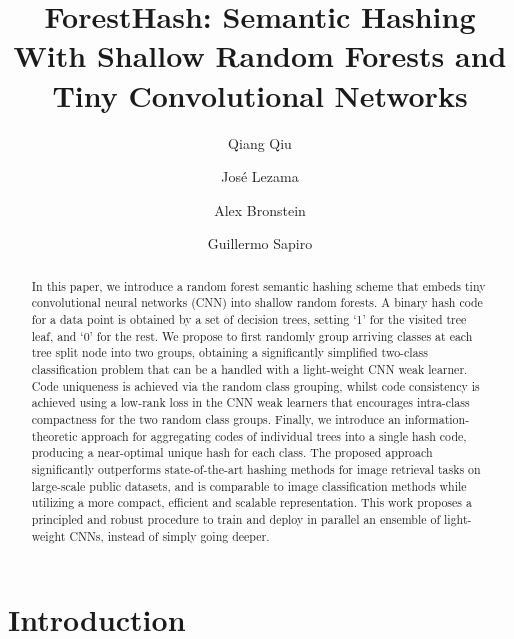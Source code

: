 \documentclass[runningheads]{llncs}
\begin{document}
\title{ForestHash: Semantic Hashing With Shallow Random Forests and Tiny Convolutional Networks}


\author{Qiang Qiu \and
Jos\'e Lezama \and
Alex Bronstein \and
Guillermo Sapiro}

\maketitle              %
\begin{abstract}
In this paper, we introduce a random forest semantic hashing scheme that embeds
tiny convolutional neural networks (CNN) into shallow random forests.  A binary
hash code for a data point is obtained by a set of decision trees, setting `1'
for the visited tree leaf, and `0' for the rest.  We propose to first randomly
group arriving classes at each tree split node into two groups, obtaining a
significantly simplified two-class classification problem that can be a handled
with a light-weight CNN weak learner. Code uniqueness is achieved via the random
class grouping, whilst code consistency is achieved using a low-rank loss in the
CNN weak learners that encourages intra-class compactness for the two random class
groups. Finally, we introduce an information-theoretic approach for aggregating
codes of individual trees into a single hash code, producing a near-optimal
unique hash for each class. The proposed approach significantly outperforms
state-of-the-art hashing methods for image retrieval tasks on large-scale public
datasets, and is comparable to image classification methods while utilizing a
more compact, efficient and scalable representation. This work proposes a
principled and robust procedure to train and deploy in parallel an ensemble of
light-weight CNNs, instead of simply going deeper.
\end{abstract}
\section{Introduction}
\label{sec:intr}
\end{document}

